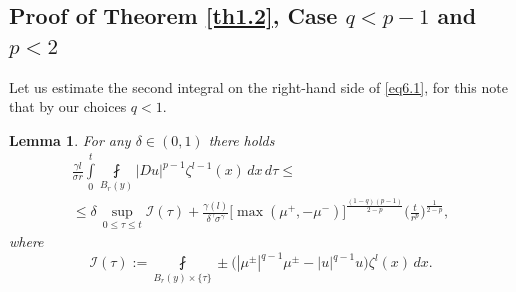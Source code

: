 \documentclass[a4paper,11pt,fullpage]{article}
\numberwithin{equation}{section}
\newtheorem{lemma}{Lemma}[section]
\begin{document}
\subsection{Proof of Theorem \ref{th1.2}, Case $q<p-1$ and $p<2$}

Let us  estimate the second integral on the right-hand side of \eqref{eq6.1}, for this note that by our choices $q<1$.
\begin{lemma}\label{lem6.1}
For any $\delta\in (0, 1)$ there holds
\begin{multline}\label{eq6.2}
\frac{\gamma l}{\sigma r}\int\limits^t_0\fint\limits_{B_{r}(y)}|D u|^{p-1} \zeta^{l-1}(x)\,dx\,d\tau\leqslant \\\leqslant \delta\,\sup\limits_{0\leqslant\tau\leqslant t}\mathcal{I}(\tau)+\frac{\gamma(l)}{\delta^\gamma \sigma^\gamma}\big[\max(\mu^+, -\mu^-)\big]^{\frac{(1-q)(p-1)}{2-p}}
\Big(\frac{t}{r^p}\Big)^{\frac{1}{2-p}},
\end{multline}
where
$$\mathcal{I}(\tau):=\fint\limits_{B_{r}(y)\times\{\tau\}}
\pm\big(|\mu^{\pm}|^{q-1}\mu^{\pm}-|u|^{q-1}u\big)\zeta^l(x)\,dx.$$
\end{lemma}
\end{document}
